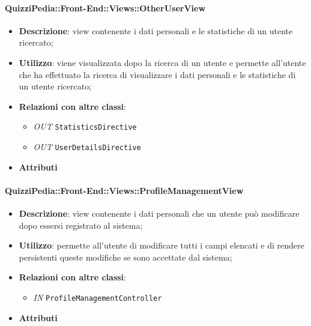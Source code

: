 \paragraph{QuizziPedia::Front-End::Views::OtherUserView}
\begin{itemize}
	\item \textbf{Descrizione}: view contenente i dati personali e le statistiche di un utente ricercato;
	\item \textbf{Utilizzo}: viene visualizzata dopo la ricerca di un utente e permette all'utente che ha effettuato la ricerca di visualizzare i dati personali e le statistiche di un utente ricercato;
	\item \textbf{Relazioni con altre classi}:
	\begin{itemize}
		\item \textit{OUT} \texttt{StatisticsDirective}
		\item \textit{OUT} \texttt{UserDetailsDirective}
	\end{itemize}
	\item \textbf{Attributi}
\end{itemize}

\paragraph{QuizziPedia::Front-End::Views::ProfileManagementView}
\begin{itemize}
	\item \textbf{Descrizione}: view contenente i dati personali che un utente può modificare dopo essersi registrato al sistema;
	\item \textbf{Utilizzo}: permette all'utente di modificare tutti i campi elencati e di rendere persistenti queste modifiche se sono accettate dal sistema;
	\item \textbf{Relazioni con altre classi}:
	\begin{itemize}
		\item \textit{IN} \texttt{ProfileManagementController} \\
	\end{itemize}
	\item \textbf{Attributi}
\end{itemize}

